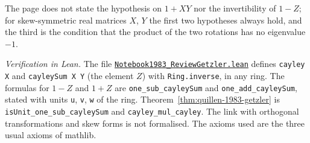 \noindent The page does not state the hypothesis on $1 + XY$ nor the invertibility of $1 - Z$; for skew-symmetric real matrices $X$, $Y$ the first two hypotheses always hold, and the third is the condition that the product of the two rotations has no eigenvalue $-1$.

\emph{Verification in Lean.} The file \href{\leanblobmain/Notebook1983_ReviewGetzler.lean}{\texttt{Notebook1983\_\allowbreak{}ReviewGetzler.\allowbreak{}lean}} defines \texttt{cayley X} and \texttt{cayleySum X Y} (the element $Z$) with \texttt{Ring.inverse}, in any ring. The formulas for $1 - Z$ and $1 + Z$ are \texttt{one\_sub\_cayleySum} and \texttt{one\_add\_cayleySum}, stated with units \texttt{u}, \texttt{v}, \texttt{w} of the ring. Theorem~\ref{thm:quillen-1983-getzler} is \texttt{isUnit\_one\_sub\_cayleySum} and \texttt{cayley\_mul\_cayley}. The link with orthogonal transformations and skew forms is not formalised. The axioms used are the three usual axioms of mathlib.

